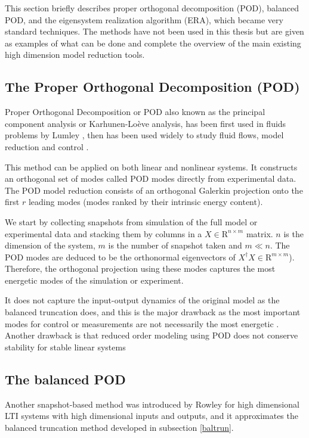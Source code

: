 \documentclass[12pt,lot, lof]{puthesis}
\begin{document}
This section  briefly describes proper orthogonal decomposition (POD), balanced POD, and the eigensystem realization algorithm (ERA), which became very standard techniques. The methods have not been used in this thesis but are given as examples of what can be done and complete the overview of the main existing high dimension model reduction tools.

\subsection{The Proper Orthogonal Decomposition (POD)}
Proper Orthogonal Decomposition or POD also known as the principal component analysis or Karhunen-Loève analysis, has been first used in fluids problems by Lumley \cite{Lumley67, Lumley70}, then has been used widely to study fluid flows, model reduction and control \cite{Sirovich87, Aubry88, Holmes96}. 

This method can be applied on both linear and nonlinear systems. It constructs an orthogonal set of modes called POD modes directly from experimental data. The POD model reduction consists of an orthogonal Galerkin projection onto the first $r$ leading modes (modes ranked by their intrinsic energy content). 

We start by collecting snapshots from simulation of the full model or experimental data and stacking them by columns in a $X \in \text{R}^{n \times m}$ matrix. $n$ is the dimension of the system, $m$ is the number of snapshot taken and $m \ll n$.
The POD modes are deduced to be the orthonormal eigenvectors of $X^{\dagger}X \in \text{R}^{m \times m}$). Therefore, the orthogonal projection using these modes captures the most energetic modes of the simulation or experiment.

It does not capture the input-output dynamics of the original model as the balanced truncation does, and this is the major drawback as the most important modes for control or measurements are not necessarily the most energetic \cite{Smith05, Ilak08}. Another drawback is that reduced order modeling using POD does not conserve stability for stable linear systems \cite{Smith03}

\subsection{The balanced POD}
Another snapshot-based method was introduced by Rowley \cite{Rowley05} for high dimensional LTI systems with high dimensional inputs and outputs, and it approximates the balanced truncation method developed in subsection \ref{baltrun}.
\end{document}
